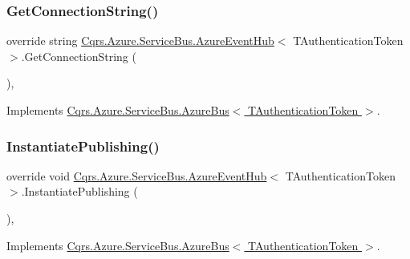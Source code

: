 \subsubsection{\texorpdfstring{Get\+Connection\+String()}{GetConnectionString()}}
{\footnotesize\ttfamily override string \hyperlink{classCqrs_1_1Azure_1_1ServiceBus_1_1AzureEventHub}{Cqrs.\+Azure.\+Service\+Bus.\+Azure\+Event\+Hub}$<$ T\+Authentication\+Token $>$.Get\+Connection\+String (\begin{DoxyParamCaption}{ }\end{DoxyParamCaption})\hspace{0.3cm}{\ttfamily [protected]}, {\ttfamily [virtual]}}



Implements \hyperlink{classCqrs_1_1Azure_1_1ServiceBus_1_1AzureBus_a514e371d5ce093678365af31e6c274e3_a514e371d5ce093678365af31e6c274e3}{Cqrs.\+Azure.\+Service\+Bus.\+Azure\+Bus$<$ T\+Authentication\+Token $>$}.

\mbox{\label{classCqrs_1_1Azure_1_1ServiceBus_1_1AzureEventHub_a3747fb9fcb3de2a72c8a6d7bbd92db95_a3747fb9fcb3de2a72c8a6d7bbd92db95}} 
\subsubsection{\texorpdfstring{Instantiate\+Publishing()}{InstantiatePublishing()}}
{\footnotesize\ttfamily override void \hyperlink{classCqrs_1_1Azure_1_1ServiceBus_1_1AzureEventHub}{Cqrs.\+Azure.\+Service\+Bus.\+Azure\+Event\+Hub}$<$ T\+Authentication\+Token $>$.Instantiate\+Publishing (\begin{DoxyParamCaption}{ }\end{DoxyParamCaption})\hspace{0.3cm}{\ttfamily [protected]}, {\ttfamily [virtual]}}



Implements \hyperlink{classCqrs_1_1Azure_1_1ServiceBus_1_1AzureBus_a0bacaa4619921333da4a27371c1d6d0a_a0bacaa4619921333da4a27371c1d6d0a}{Cqrs.\+Azure.\+Service\+Bus.\+Azure\+Bus$<$ T\+Authentication\+Token $>$}.

